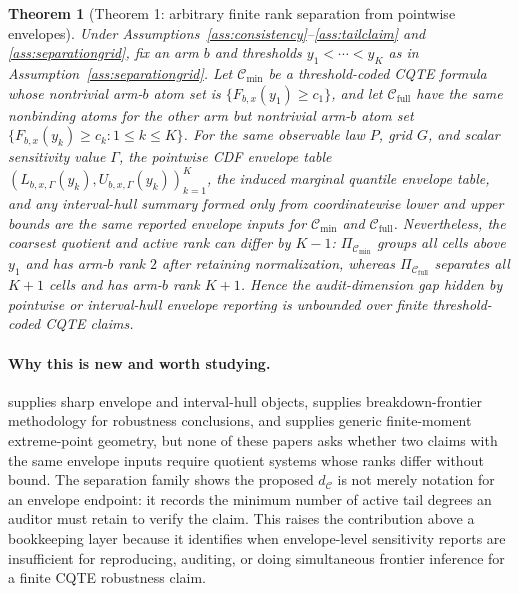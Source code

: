 \documentclass[11pt]{article}
\theoremstyle{definition}
\theoremstyle{plain}
\newtheorem{theorem}{Theorem}
\theoremstyle{remark}
\begin{document}
\begin{theorem}[Theorem 1: arbitrary finite rank separation from pointwise envelopes]\label{thm:rank-separation-witness}
Under Assumptions~\ref{ass:consistency}--\ref{ass:tailclaim} and \ref{ass:separationgrid}, fix an arm \(b\) and thresholds \(y_1<\cdots<y_K\) as in Assumption~\ref{ass:separationgrid}.  Let \(\mathcal{C}_{\min}\) be a threshold-coded CQTE formula whose nontrivial arm-\(b\) atom set is \(\{F_{b,x}(y_1)\ge c_1\}\), and let \(\mathcal{C}_{\mathrm{full}}\) have the same nonbinding atoms for the other arm but nontrivial arm-\(b\) atom set \(\{F_{b,x}(y_k)\ge c_k:1\le k\le K\}\).  For the same observable law \(P\), grid \(G\), and scalar sensitivity value \(\Gamma\), the pointwise CDF envelope table \((L_{b,x,\Gamma}(y_k),U_{b,x,\Gamma}(y_k))_{k=1}^K\), the induced marginal quantile envelope table, and any interval-hull summary formed only from coordinatewise lower and upper bounds are the same reported envelope inputs for \(\mathcal{C}_{\min}\) and \(\mathcal{C}_{\mathrm{full}}\).  Nevertheless, the coarsest quotient and active rank can differ by \(K-1\): \(\Pi_{\mathcal{C}_{\min}}\) groups all cells above \(y_1\) and has arm-\(b\) rank \(2\) after retaining normalization, whereas \(\Pi_{\mathcal{C}_{\mathrm{full}}}\) separates all \(K+1\) cells and has arm-\(b\) rank \(K+1\).  Hence the audit-dimension gap hidden by pointwise or interval-hull envelope reporting is unbounded over finite threshold-coded CQTE claims.
\end{theorem}
\paragraph{Why this is new and worth studying.}
\citet{Wang2026} supplies sharp envelope and interval-hull objects, \citet{MastenPoirier2020} supplies breakdown-frontier methodology for robustness conclusions, and \citet{Winkler1988} supplies generic finite-moment extreme-point geometry, but none of these papers asks whether two claims with the same envelope inputs require quotient systems whose ranks differ without bound.  The separation family shows the proposed \(d_{\mathcal{C}}\) is not merely notation for an envelope endpoint: it records the minimum number of active tail degrees an auditor must retain to verify the claim.  This raises the contribution above a bookkeeping layer because it identifies when envelope-level sensitivity reports are insufficient for reproducing, auditing, or doing simultaneous frontier inference for a finite CQTE robustness claim.
\end{document}
